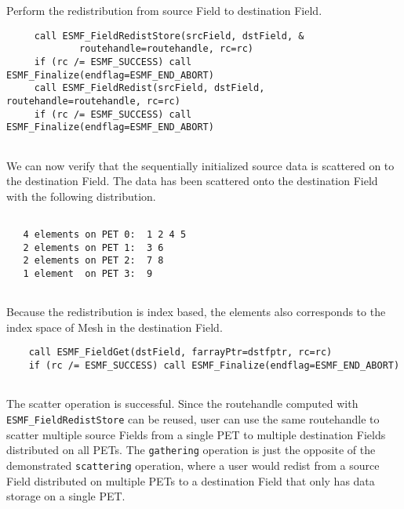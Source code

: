 
   Perform the redistribution from source Field to destination Field. 

 \begin{verbatim}
     call ESMF_FieldRedistStore(srcField, dstField, &
             routehandle=routehandle, rc=rc)
     if (rc /= ESMF_SUCCESS) call ESMF_Finalize(endflag=ESMF_END_ABORT)
     call ESMF_FieldRedist(srcField, dstField, routehandle=routehandle, rc=rc)
     if (rc /= ESMF_SUCCESS) call ESMF_Finalize(endflag=ESMF_END_ABORT)
 
\end{verbatim}
 

   We can now verify that the sequentially initialized source data is scattered
   on to the destination Field. The data has been scattered onto the destination
   Field with the following distribution.
  \begin{verbatim}
  
   4 elements on PET 0:  1 2 4 5
   2 elements on PET 1:  3 6
   2 elements on PET 2:  7 8
   1 element  on PET 3:  9
  
  \end{verbatim}
   Because the redistribution is index based, the elements also corresponds to the
   index space of Mesh in the destination Field. 

 \begin{verbatim}
    call ESMF_FieldGet(dstField, farrayPtr=dstfptr, rc=rc)
    if (rc /= ESMF_SUCCESS) call ESMF_Finalize(endflag=ESMF_END_ABORT)
 
\end{verbatim}
 

   The scatter operation is successful. Since the routehandle computed with
   {\tt ESMF\_FieldRedistStore} can be reused, user can use the same routehandle
   to scatter multiple source Fields from a single PET to multiple destination
   Fields distributed on all PETs. The {\tt gathering} operation is just the 
   opposite of the demonstrated {\tt scattering} operation, where a user would
   redist from a source Field distributed on multiple PETs to a destination Field
   that only has data storage on a single PET.
  
